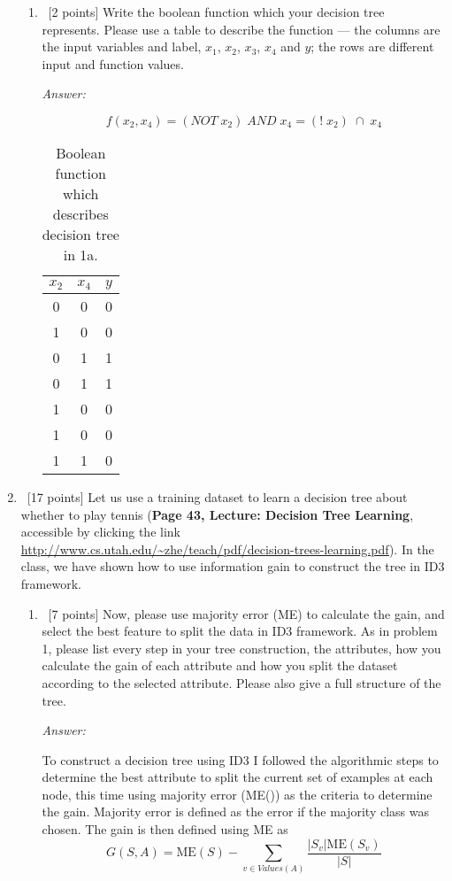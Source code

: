 \documentclass[12pt, fullpage,letterpaper]{article}
\begin{document}
\begin{enumerate}
\begin{enumerate}
\item~[2 points] Write the boolean function which your decision tree represents. Please use a table to describe the function --- the columns are the input variables and label, \ie $x_1$, $x_2$, $x_3$, $x_4$ and $y$; the rows are different input and  function values. 



\textit{Answer:} 

\[
f(x_2, x_4) = (NOT\; x_2)\; AND\; x_4 = (!\; x_2)\; \cap\; x_4 
\]

\begin{table}[h]
	\centering
	\begin{tabular}{cc|c}
		$x_2$ & $x_4$ & $y$\\ 
		\hline\hline
		0 & 0 & 0 \\ \hline
		1 & 0 & 0 \\ \hline
		0 & 1 & 1 \\ \hline
		0 & 1 & 1 \\ \hline
		1 & 0 & 0 \\ \hline
		1 & 0 & 0 \\ \hline
		1 & 1 & 0 \\ \hline
	\end{tabular}
	\caption{Boolean function which describes decision tree in 1a.}
\end{table}
\end{enumerate}

\item~[17 points] Let us use a training dataset to learn a decision tree about whether to play tennis (\textbf{Page 43, Lecture: Decision Tree Learning}, accessible by clicking the link \href{http://www.cs.utah.edu/~zhe/teach/pdf/decision-trees-learning.pdf}{http://www.cs.utah.edu/\textasciitilde zhe/teach/pdf/decision-trees-learning.pdf}). In the class, we have shown how to use information gain to construct the tree in ID3 framework.  
\begin{enumerate}
	\item~[7 points] Now, please use majority error (ME) to calculate the gain, and select the best feature to split the data in ID3 framework. As in problem 1, please list every step in your tree construction,  the attributes,  how you calculate the gain of each attribute and how you split the dataset according to the selected attribute. Please also give a full structure of the tree.

    \textit{Answer:} 

    To construct a decision tree using ID3 I followed the algorithmic steps to determine the best attribute to split the current set of examples at each node, this time using majority error (ME()) as the criteria to determine the gain. Majority error is defined as the error if the majority class was chosen. The gain is then defined using ME as 
    \[
    G(S,A) = \text{ME}(S) - \sum_{v \in Values(A)}{\frac{|S_v|\text{ME}(S_v)}{|S|}} 
    \] 


\end{enumerate}
\end{enumerate}
\end{document}
